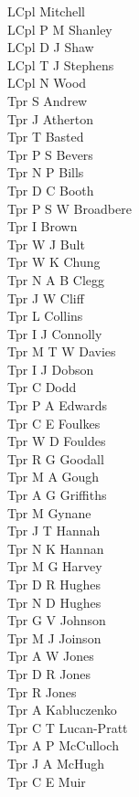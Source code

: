 \begin{multicols}{3}
  LCpl Mitchell \\
  LCpl P M Shanley \\
  LCpl D J Shaw \\
  LCpl T J Stephens \\
  LCpl N Wood \\
  Tpr S Andrew \\
  Tpr J Atherton \\
  Tpr T Basted \\
  Tpr P S Bevers \\
  Tpr N P Bills \\
  Tpr D C Booth \\
  Tpr P S W Broadbere \\
  Tpr I Brown \\
  Tpr W J Bult \\
  Tpr W K Chung \\
  Tpr N A B Clegg \\
  Tpr J W Cliff \\
  Tpr L Collins \\
  Tpr I J Connolly \\
  Tpr M T W Davies \\
  Tpr I J Dobson \\
  Tpr C Dodd \\
  Tpr P A Edwards \\
  Tpr C E Foulkes \\
  Tpr W D Fouldes \\
  Tpr R G Goodall \\
  Tpr M A Gough \\
  Tpr A G Griffiths \\
  Tpr M Gynane \\
  Tpr J T Hannah \\
  Tpr N K Hannan \\
  Tpr M G Harvey \\
  Tpr D R Hughes \\
  Tpr N D Hughes \\
  Tpr G V Johnson \\
  Tpr M J Joinson \\
  Tpr A W Jones \\
  Tpr D R Jones \\
  Tpr R Jones \\
  Tpr A Kabluczenko \\
  Tpr C T Lucan-Pratt \\
  Tpr A P McCulloch \\
  Tpr J A McHugh \\
  Tpr C E Muir \\

\end{multicols}
